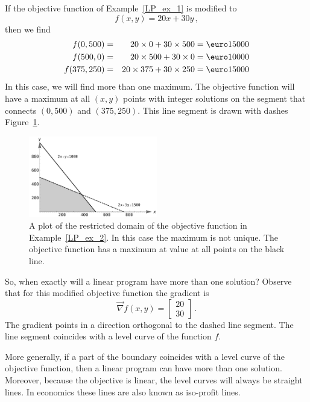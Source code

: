\pagebreak
\begin{example}
\label{LP_ex_2}
If the objective function of Example~\ref{LP_ex_1} is modified to
$$f(x,y) = 20x + 30y \,,$$
then we find
\begin{eqnarray*}
f(0,500) &=& 20\times 0 + 30 \times 500 = \text{\euro} 15000 \\
f(500, 0) &=& 20 \times 500 + 30 \times 0 = \text{\euro} 10000 \\
f(375, 250) &=& 20 \times 375 + 30 \times 250 = \text{\euro} 15000 
\end{eqnarray*}
In this case, we will find more than one maximum. The objective function will have a maximum at all $(x,y)$ points with integer solutions on the segment that connects $(0,500)$ and $(375,250)$. This line segment is drawn with dashes Figure~\ref{fig_multi_var_30}. 


\begin{figure}[H]
\centering
\includegraphics[width=0.5\textwidth]{fig_multi_var_30}
\caption{A plot of the restricted domain of the objective function in Example~\ref{LP_ex_2}. In this case the maximum is not unique. The objective function has a maximum at value at all points on the black line.}
\label{fig_multi_var_30}
\end{figure}


So, when exactly will a linear program have more than one solution? Observe that for this modified objective function the gradient is $$\vec{\nabla} f(x,y) = \begin{bmatrix}20 \\ 30 \end{bmatrix} \,.$$
The gradient points in a direction orthogonal to the dashed line segment. The line segment coincides with a level curve of the function $f$. 
\end{example}

More generally, if a part of the boundary coincides with a level curve of the objective function, then a linear program can have more than one solution. Moreover, because the objective is linear, the level curves will always be straight lines. In economics these lines are also known as iso-profit lines. 


